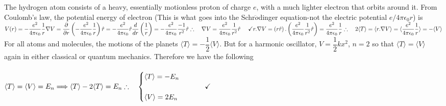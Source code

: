 \documentclass[fleqn]{article}
\begin{document}
\begin{enumerate}
\begin{enumerate}
      \textcolor{hwColor}{
        The hydrogen atom consists of a heavy, essentially motionless proton of charge $e$, with a much lighter electron that orbits around it.
        From Coulomb's law, the potential energy of electron (This is what goes into the Schr$\ddot{o}$dinger equation-not the electric potential
        $e/4 \pi \epsilon_0 r$) is
        $
          V(r)=-\dfrac{e^2}{4 \pi \epsilon_0} \dfrac{1}{r}
          \\
          \\
          \\
          \nabla V=\dfrac{\partial }{\partial r} \left(-\dfrac{e^2}{4 \pi \epsilon_0} \dfrac{1}{r}\right) \hat{r}
          =-\dfrac{e^2}{4 \pi \epsilon_0} \hat{r} \dfrac{d}{dr} \left(\dfrac{1}{r}\right)
          =-\dfrac{e^2}{4 \pi \epsilon_0} \dfrac{-1}{r^2} \hat{r}
          \\
          \\
          \\
          \therefore ~~~ \nabla V=\dfrac{e^2}{4 \pi \epsilon_0} \dfrac{1}{r^2} \hat{r} ~~~~ \checkmark
          \\
          \\
          \\
          r.\nabla V=\left(r \hat{r}\right).\left(\dfrac{e^2}{4 \pi \epsilon_0} \dfrac{1}{r^2} \hat{r}\right)
          =\dfrac{e^2}{4 \pi \epsilon_0} \dfrac{1}{r}
          \\
          \\
          \\
          \therefore ~~~ 2 \langle T \rangle=\langle r. \nabla V \rangle=\langle \dfrac{e^2}{4 \pi \epsilon_0} \dfrac{1}{r} \rangle=-\langle V \rangle
          \\
          \\
        $
        For all atoms and molecules, the motions of the planets $\langle T \rangle=-\dfrac{1}{2} \langle V \rangle$. But for a
        harmonic oscillator, $V=\dfrac{1}{2} kx^2$, $n=2$ so that $\langle T \rangle=\langle V \rangle$ again in either 
        classical or quantum mechanics. Therefore we have the following
        \\
        \\
        $
          \langle T \rangle=\langle V \rangle=E_n \Longrightarrow \langle T \rangle-2\langle T \rangle=E_n
          \\
          \\
          \\
          \therefore ~~~ \begin{cases}
            \langle T \rangle=-E_n
            \\
            \\
            \langle V \rangle=2 E_n
          \end{cases} ~~~~~~~ \checkmark
        $
      }

    \end{enumerate}
    
  \end{enumerate}
\end{document}
